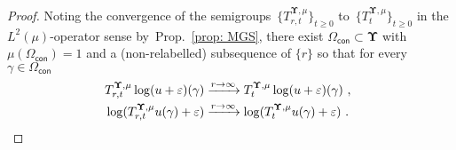 \documentclass[11pt,letterpaper]{amsart}
\newcommand{\sem}[1]{\{#1\}_{t \ge 0}}
\newcommand{\N}{{\mathbb N}}
\newcommand{\comma}{\,\,\mathrm{,}\;\,}
\newcommand{\fstop}{\,\,\mathrm{.}}
\newcommand{\QP}{{\mu}}
\newcommand{\e}{\varepsilon}
\newcommand{\dUpsilon}{{\mathbf \Upsilon}}
\newcommand{\U}{\dUpsilon}
\renewcommand{\1}{\mathbf 1}
\numberwithin{equation}{section}
\theoremstyle{plain}
\theoremstyle{definition}
\theoremstyle{remark}
\begin{document}
\begin{proof}
Noting  the convergence of the semigroups~$\sem{T_{r, t}^{\U, \QP}}$ to~$\sem{T_t^{\U, \QP}}$ in the $L^2(\QP)$-operator sense by~Prop.~\ref{prop: MGS}, there exist $\Omega_{\mathsf{con}} \subset \U$ with $\QP(\Omega_{\mathsf{con}})=1$ and a (non-relabelled) subsequence of $\{r\}$ so that for every $\gamma \in \Omega_{\mathsf{con}}$ 
\begin{align} \label{e:semO}
&T^{\U, \QP}_{r, t}\log (u+\e)(\gamma) \xrightarrow{r \to \infty} T^{\U, \QP}_{t}\log (u+\e)(\gamma) \comma 
\\
&\log (T^{\U, \QP}_{r, t}u(\gamma)+\e) \xrightarrow{r \to \infty}  \log (T^{\U, \QP}_{t}u(\gamma)+\e) \fstop \notag
\end{align}


\end{proof}
\end{document}
